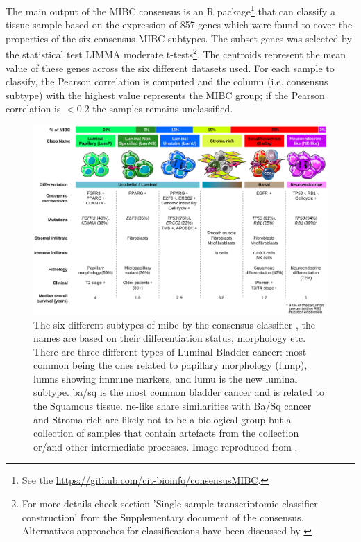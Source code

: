 The main output of the MIBC consensus is an R package\footnote{See the \url{https://github.com/cit-bioinfo/consensusMIBC}.} that can classify a tissue sample based on the expression of 857 genes which were found to cover the properties of the six consensus MIBC subtypes. The subset genes was selected by the statistical test LIMMA moderate t-tests\footnote{For more details check section 'Single-sample transcriptomic classifier construction' from the Supplementary document of the consensus. Alternatives approaches for classifications have been discussed by \citet{Eriksson2022-vw}}. The centroids represent the mean value of these genes across the six different datasets used. For each sample to classify, the Pearson correlation is computed and the column (i.e. consensus subtype) with the highest value represents the MIBC group; if the Pearson correlation is $<$0.2 the samples remains unclassified. 

\begin{figure}[!t]   
\centering
\includegraphics[width=1.0\textwidth,height=1.0\textheight,keepaspectratio]{Sections/Lit_review/Resources/2020_consensus_subtypes.jpg}
  \caption[Summary of the MIBC consensus subgroups]{The six different subtypes of \acrfull{mibc} by the consensus classifier \citep{Kamoun2020-tj}, the names are based on their differentiation status, morphology etc. There are three different types of Luminal Bladder cancer: most common being the ones related to papillary morphology (\acrfull{lump}), \acrfull{lumns} showing immune markers, and \acrfull{lumu} is the new luminal subtype. \acrfull{ba/sq} is the most common bladder cancer and is related to the Squamous tissue. \acrfull{ne-like} share similarities with Ba/Sq cancer and Stroma-rich are likely not to be a biological group but a collection of samples that contain artefacts from the collection or/and other intermediate processes. Image reproduced from \citep{Kamoun2020-tj}.
}
\label{fig:lit:2020_consens}
\end{figure}
\FloatBarrier


